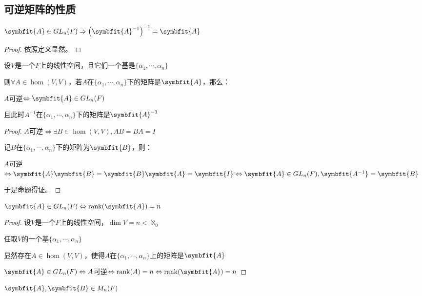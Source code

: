 \documentclass[12pt, a4paper, oneside, UTF8]{ctexbook}
\begin{document}
		\subsection{可逆矩阵的性质}
			\begin{para}{0}
				\point{}
					\begin{proposition}
						$\symbfit{A} \in GL_n(F) \Rightarrow \left(\symbfit{A}^{-1}\right)^{-1}=\symbfit{A}$
					\end{proposition}
					\begin{proof}
						依照定义显然。
					\end{proof}
				\point{}
					\begin{proposition}
						设$V$是一个$F$上的线性空间，且它们一个基是$\{\alpha _1,\cdots,\alpha _n\}$

						则$\forall A \in \hom(V,V)$，若$A$在$\{\alpha_1,\cdots,\alpha_n\}$下的矩阵是$\symbfit{A}$，那么：
						
						$A$可逆$\Leftrightarrow \symbfit{A} \in GL_n(F)$

						且此时$A^{-1}$在$\{\alpha_1,\cdots,\alpha_n\}$下的矩阵是$\symbfit{A}^{-1}$
					\end{proposition}
					\begin{proof}
						$A$可逆$\Leftrightarrow \exists B \in \hom(V,V),AB=BA=I $
						
						记$B$在$\{\alpha_1,\cdots,\alpha_n\}$下的矩阵为$\symbfit{B}$，则：
						
						$A$可逆$\Leftrightarrow \symbfit{A}\symbfit{B} = \symbfit{B}\symbfit{A} = \symbfit{I} \Leftrightarrow \symbfit{A} \in GL_n(F),\symbfit{A^{-1}}=\symbfit{B}$

						于是命题得证。
					\end{proof}
				\point{}
					\begin{proposition}
						$\symbfit{A} \in GL_n(F) \Leftrightarrow \rank(\symbfit{A})=n$
					\end{proposition}
					\begin{proof}
						设$V$是一个$F$上的线性空间，$\dim V = n < \aleph_0$

						任取$V$的一个基$\{\alpha_1,\cdots,\alpha_n\}$

						显然存在$A \in \hom(V,V)$，使得$A$在$\{\alpha_1,\cdots,\alpha_n\}$上的矩阵是$\symbfit{A}$

						$\symbfit{A} \in GL_n(F) \Leftrightarrow A$可逆$\Leftrightarrow \rank(A)=n \Leftrightarrow \rank(\symbfit{A})=n$
					\end{proof}
				\point{}
					\begin{proposition}
						$\symbfit{A},\symbfit{B} \in M_n(F)$


\end{proposition}
\end{para}
\end{document}
